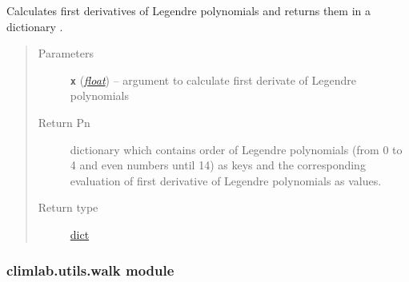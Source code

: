 \documentclass[a4paper,10pt,english]{sphinxmanual}
\begin{document}

\begin{fulllineitems}
\label{api/climlab.utils:climlab.utils.legendre.Pnprime}
Calculates first derivatives of Legendre polynomials and returns them 
in a dictionary .
\begin{quote}\begin{description}
\item[{Parameters}] \leavevmode
\textbf{\texttt{x}} (\href{http://docs.python.org/2.7/library/functions.html\#float}{\emph{float}}) -- argument to calculate first derivate of Legendre polynomials

\item[{Return Pn}] \leavevmode
dictionary which contains order of Legendre polynomials
(from 0 to 4 and even numbers until 14) as keys and 
the corresponding evaluation of first derivative of 
Legendre polynomials as values.

\item[{Return type}] \leavevmode
\href{http://docs.python.org/2.7/library/stdtypes.html\#dict}{dict}

\end{description}\end{quote}

\end{fulllineitems}



\subsubsection{climlab.utils.walk module}
\label{api/climlab.utils:module-climlab.utils.walk}\label{api/climlab.utils:climlab-utils-walk-module}
\end{document}
